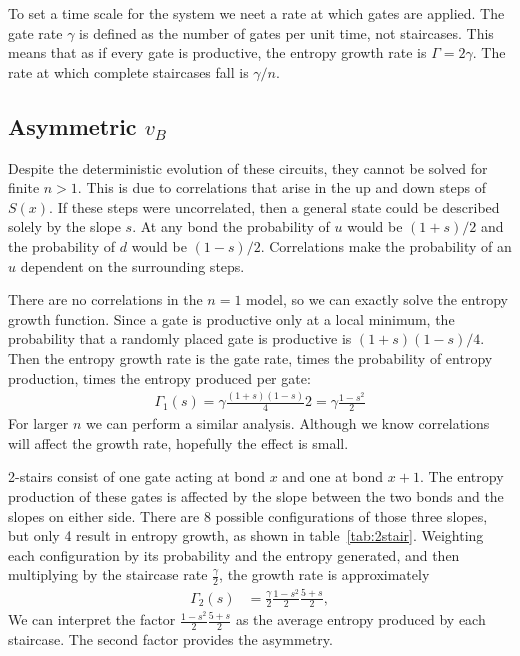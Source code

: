 \documentclass[aps,prx,reprint,superscriptaddress, longbibliography]{revtex4-1}
\begin{document}
To set a time scale for the system we neet a rate at which gates are applied. The gate rate $\gamma$ is defined as the number of gates per unit time, not staircases. This means that as if every gate is productive, the entropy growth rate is $\Gamma=2\gamma$. The rate at which complete staircases fall is $\gamma/n$.

\subsection{Asymmetric $v_B$} \label{sub:asym}

Despite the deterministic evolution of these circuits, they cannot be solved for finite $n>1$. This is due to correlations that arise in the up and down steps of $S(x)$. If these steps were uncorrelated, then a general state could be described solely by the slope $s$. At any bond the probability of $u$ would be $(1+s)/2$ and the probability of $d$ would be $(1-s)/2$. Correlations make the probability of an $u$ dependent on the surrounding steps. 

There are no correlations in the $n=1$ model, so we can exactly solve the entropy growth function.
Since a gate is productive only at a local minimum, the probability that a randomly placed gate is productive is $(1+s)(1-s)/4$. Then the entropy growth rate is the gate rate, times the probability of entropy production, times the entropy produced per gate:
\begin{align}
\Gamma_1(s)=\gamma\frac{(1+s)(1-s)}{4}2 = \gamma\frac{1-s^2}{2}
\end{align}
For larger $n$ we can perform a similar analysis. Although we know correlations will affect the growth rate, hopefully the effect is small. 


2-stairs consist of one gate acting at bond $x$ and one at bond $x+1$. The entropy production of these gates is affected by the slope between the two bonds and the slopes on either side. There are 8 possible configurations of those three slopes, but only 4 result in entropy growth, as shown in table~\ref{tab:2stair}. Weighting each configuration by its probability and the entropy generated, and then multiplying by the staircase rate $\frac{\gamma}{2}$, the growth rate is approximately
\begin{align}
\Gamma_2(s) 
&= \frac{\gamma}{2}\frac{1-s^2}{2}\frac{5+s}{2}, \label{eqn:2rate}
\end{align}
We can interpret the factor $\frac{1-s^2}{2}\frac{5+s}{2}$ as the average entropy produced by each staircase. The second factor provides the asymmetry.
\end{document}
